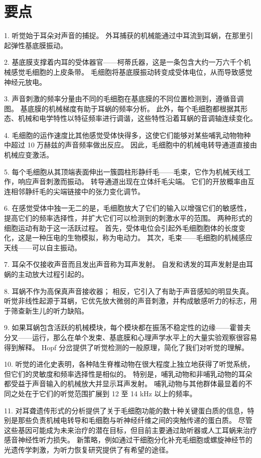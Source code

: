 \section{要点}

1. 听觉始于耳朵对声音的捕捉。
外耳捕获的机械能通过中耳流到耳蜗，在那里引起弹性基底膜振动。


2. 基底膜支撑着内耳的受体器官——柯蒂氏器，这是一条包含大约一万六千个机械感觉毛细胞的上皮条带。
毛细胞将基底膜振动转变成受体电位，从而导致感觉神经元放电。


3. 声音刺激的频率分量由不同的毛细胞在基底膜的不同位置检测到，遵循音调图。
基底膜的机械梯度有助于耳蜗的频率分析。
此外，每个毛细胞都根据其形态、机械和电学特性以特征频率进行调谐，这些特性沿着耳蜗的音调轴连续变化。 


4. 毛细胞的运作速度比其他感觉受体快得多，这使它们能够对某些哺乳动物物种中超过 10 万赫兹的声音频率做出反应。
因此，毛细胞中的机械电转导通道直接由机械应变激活。 


5. 每个毛细胞从其顶端表面伸出一簇圆柱形静纤毛——毛束，它作为机械天线工作，响应声音刺激而振动。
转导通道出现在立体纤毛尖端。
它们的开放概率由互连相邻静纤毛的尖端链接中的张力变化调节。


6. 在感觉受体中独一无二的是，毛细胞放大了它们的输入以增强它们的敏感性，提高它们的频率选择性，并扩大它们可以检测到的刺激水平的范围。
两种形式的细胞运动有助于这一活跃过程。
首先，受体电位会引起外毛细胞胞体的长度变化，这是一种压电的生物模拟，称为电动力。
其次，毛束——毛细胞的机械感应天线——可以自主振动。 


7. 耳朵不仅接收声音而且发出声音称为耳声发射。
自发和诱发的耳声发射是由耳蜗的主动放大过程引起的。 


8. 耳蜗不作为高保真声音接收器；
相反，它引入了有助于声音感知的明显失真。
听觉非线性起源于耳蜗，它优先放大微弱的声音刺激，并构成敏感听力的标志，用于筛查新生儿的听力缺陷。


9. 如果耳蜗包含活跃的机械模块，每个模块都在振荡不稳定性的边缘——霍普夫分叉——运行，那么在单个发束、基底膜和心理声学水平上的大量实验观察很容易得到解释。
Hopf 分岔提供了听觉检测的一般原理，简化了我们对听觉的理解。


10. 听觉的进化史表明，各种陆生脊椎动物在很大程度上独立地获得了听觉系统，但它们的灵敏度和频率选择性是相似的。
特别是，哺乳动物和非哺乳动物的耳朵都受益于声音输入的机械放大并显示耳声发射。
哺乳动物与其他群体最显着的不同之处在于它们的听觉范围扩展到 12 至 14 kHz 以上的频率。


11. 对耳聋遗传形式的分析提供了关于毛细胞功能的数十种关键蛋白质的信息，特别是那些负责机械电转导和毛细胞与听神经纤维之间的突触传递的蛋白质。
尽管这些基因可能成为未来治疗的潜在目标，但目前主要通过助听器或人工耳蜗来治疗感音神经性听力损失。
新策略，例如通过干细胞分化补充毛细胞或螺旋神经节的光遗传学刺激，为听力恢复研究提供了有希望的途径。


